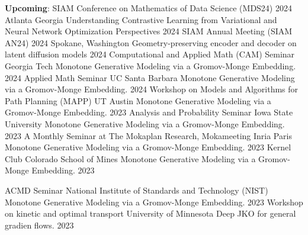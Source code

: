 

\begingroup
\allowdisplaybreaks
\begin{cvtalks}

\cvtalk
    {\textbf{Upcoming}: SIAM Conference on Mathematics of Data Science (MDS24) 2024} %
    {Atlanta Georgia}
    {Understanding Contrastive Learning from Variational and Neural Network Optimization Perspectives} %
    {2024} %
\cvtalk
    {SIAM Annual Meeting (SIAM AN24) 2024} %
    {Spokane, Washington}
    {Geometry-preserving encoder and decoder on latent diffusion models} %
    {2024} %
\cvtalk
    {Computational and Applied Math (CAM) Seminar} %
    {Georgia Tech}
    {Monotone Generative Modeling via a Gromov-Monge Embedding.} %
    {2024} %
\cvtalk
    {Applied Math Seminar} %
    {UC Santa Barbara}
    {Monotone Generative Modeling via a Gromov-Monge Embedding.} %
    {2024} %
\cvtalk
    {Workshop on Models and Algorithms for Path Planning (MAPP)} %
    {UT Austin}
    {Monotone Generative Modeling via a Gromov-Monge Embedding.} %
    {2023} %
\cvtalk
    {Analysis and Probability Seminar}
    {Iowa State University}
    {Monotone Generative Modeling via a Gromov-Monge Embedding.}
    {2023}
\cvtalk
    {A Monthly Seminar at The Mokaplan Research, Mokameeting} %
    {Inria Paris}
    {Monotone Generative Modeling via a Gromov-Monge Embedding.} %
    {2023} %
\cvtalk
    {Kernel Club} %
    {Colorado School of Mines}
    {Monotone Generative Modeling via a Gromov-Monge Embedding.} %
    {2023} %

\cvtalk
    {ACMD Seminar} %
    {National Institute of Standards and Technology (NIST)}
    {Monotone Generative Modeling via a Gromov-Monge Embedding.} %
    {2023} %
\cvtalk
    {Workshop on kinetic and optimal transport} %
    {University of Minnesota}
    {Deep JKO for general gradien flows.} %
    {2023} %
  

\end{cvtalks}
